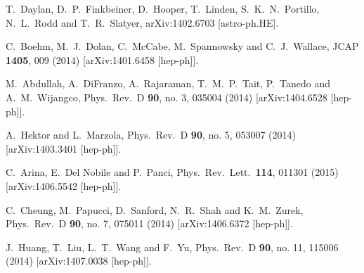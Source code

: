 \documentclass[preprintnumbers,superscriptaddress,nofootinbib,aps,prd,floatfix]{revtex4}
\begin{document}
\begin{thebibliography}{99}
  
  T.~Daylan, D.~P.~Finkbeiner, D.~Hooper, T.~Linden, S.~K.~N.~Portillo, N.~L.~Rodd and T.~R.~Slatyer,
  arXiv:1402.6703 [astro-ph.HE].

  C.~Boehm, M.~J.~Dolan, C.~McCabe, M.~Spannowsky and C.~J.~Wallace,
  JCAP {\bf 1405}, 009 (2014)
  [arXiv:1401.6458 [hep-ph]].

  M.~Abdullah, A.~DiFranzo, A.~Rajaraman, T.~M.~P.~Tait, P.~Tanedo and A.~M.~Wijangco,
  Phys.\ Rev.\ D {\bf 90}, no. 3, 035004 (2014)
  [arXiv:1404.6528 [hep-ph]].

  A.~Hektor and L.~Marzola,
  Phys.\ Rev.\ D {\bf 90}, no. 5, 053007 (2014)
  [arXiv:1403.3401 [hep-ph]].
   
  C.~Arina, E.~Del Nobile and P.~Panci,
  Phys.\ Rev.\ Lett.\  {\bf 114}, 011301 (2015)
  [arXiv:1406.5542 [hep-ph]].


  C.~Cheung, M.~Papucci, D.~Sanford, N.~R.~Shah and K.~M.~Zurek,
  Phys.\ Rev.\ D {\bf 90}, no. 7, 075011 (2014)
  [arXiv:1406.6372 [hep-ph]].



  J.~Huang, T.~Liu, L.~T.~Wang and F.~Yu,
  Phys.\ Rev.\ D {\bf 90}, no. 11, 115006 (2014)
  [arXiv:1407.0038 [hep-ph]].



\end{thebibliography}
\end{document}

